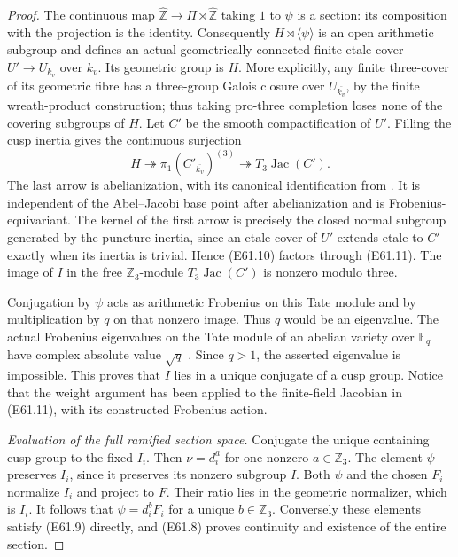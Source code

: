 \begin{proof}
The continuous map $\widehat{\mathbb Z}\to\Pi\rtimes
\widehat{\mathbb Z}$ taking $1$ to $\psi$ is a section:
its composition with the projection is the identity.
Consequently $H\rtimes\langle\psi\rangle$ is an open
arithmetic subgroup and defines an actual geometrically
connected finite etale cover $U'\to U_{k_v}$ over $k_v$.
Its geometric group is $H$. More explicitly, any finite
three-cover of its geometric fibre has a three-group Galois
closure over $U_{\overline{k_v}}$, by the finite wreath-product
construction; thus taking pro-three completion loses none
of the covering subgroups of $H$.
Let $C'$ be the smooth compactification of $U'$.
Filling the cusp inertia gives the continuous surjection
\[
 H\twoheadrightarrow\pi_1(C'_{\overline{k_v}})^{(3)}
       \twoheadrightarrow T_3\operatorname{Jac}(C').
 \tag{E61.11}
\]
The last arrow is abelianization, with its canonical
identification from \cite[III, Proposition 9.1]{E_MilneAV2008}.
It is independent of the Abel--Jacobi base point after
abelianization and is Frobenius-equivariant. The kernel of
the first arrow is precisely the closed normal subgroup
generated by the puncture inertia, since an etale cover of
$U'$ extends etale to $C'$ exactly when its inertia is trivial.
Hence (E61.10) factors through (E61.11). The image of $I$ in
the free $\mathbb Z_3$-module $T_3\operatorname{Jac}(C')$
is nonzero modulo three.

Conjugation by $\psi$ acts as arithmetic Frobenius on this
Tate module and by multiplication by $q$ on that nonzero
image. Thus $q$ would be an eigenvalue. The actual Frobenius
eigenvalues on the Tate module of an abelian variety over
$\mathbb F_q$ have complex absolute value $\sqrt q$
\cite[II, Theorem 1.1(b), Lemmas 1.2--1.3]{E_MilneAV2008}.
Since $q>1$, the asserted eigenvalue is impossible. This
proves that $I$ lies in a unique conjugate of a cusp group.
Notice that the weight argument has been applied to the
finite-field Jacobian in (E61.11), with its constructed
Frobenius action.

\emph{Evaluation of the full ramified section space.}
Conjugate the unique containing cusp group to the fixed
$I_i$. Then $\nu=d_i^a$ for one nonzero $a\in\mathbb Z_3$.
The element $\psi$ preserves $I_i$, since it preserves its
nonzero subgroup $I$. Both $\psi$ and the chosen $F_i$
normalize $I_i$ and project to $F$. Their ratio lies in the
geometric normalizer, which is $I_i$. It follows that
$\psi=d_i^bF_i$ for a unique $b\in\mathbb Z_3$.
Conversely these elements satisfy (E61.9) directly, and
(E61.8) proves continuity and existence of the entire section.


\end{proof}

